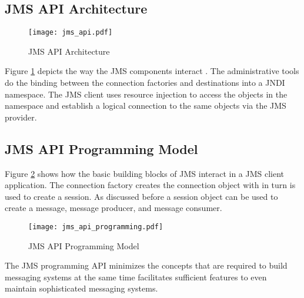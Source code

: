 \subsection {JMS API Architecture}
    \makeatletter
    \setlength{\intextsep}{20pt}
    \makeatother

    \begin{figure}[h!]
    \centering
    \texttt{[image: jms\_api.pdf]}
    \caption{JMS API Architecture}\label{figures:jms_api}
    \end{figure}

    Figure \ref{figures:jms_api} depicts the way the JMS components interact \parencite{jms_api}. The administrative tools do the binding between the connection factories and destinations into a JNDI namespace.
    The JMS client uses resource injection to access the objects in the namespace and establish a logical connection to the same objects via the JMS provider. 


 \subsection {JMS API Programming Model}

Figure  \ref{figures:jms_api_programming} shows how the basic building blocks of JMS interact in a JMS client application. The connection factory creates the connection object with in turn is used to create a session. As discussed before a session object can be used to create a message, message producer, and message consumer.

    \makeatletter
    \setlength{\intextsep}{20pt}
    \makeatother

    \begin{figure}[h!]
    \centering
    \texttt{[image: jms\_api\_programming.pdf]}
    \caption{JMS API Programming Model}\label{figures:jms_api_programming}
    \end{figure}

The JMS programming API minimizes the concepts that are required to build messaging systems at the same time facilitates sufficient features to even maintain sophisticated messaging systems.

